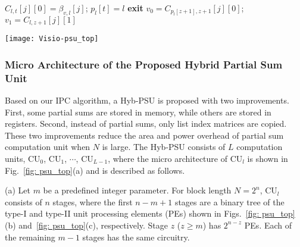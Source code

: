 \documentclass[journal]{IEEEtran}
\begin{document}
\begin{algorithm}
\DontPrintSemicolon
\label{algo: psum_comp}

\BlankLine

 {
 {
 {
$C_{l,t}[j][0] = \beta_{v,l}[j]$; $p_l[t] = l$\;
}
}
}
 {
\textbf{exit}
}
 {
 {
 {
$v_0 = C_{p_l[z+1],z+1}[j][0]$; $v_1= C_{l,z+1}[j][1]$\;
}
}
}
\caption{Index Based Partial Sum Computation (IPC) Algorithm}
\end{algorithm}





\begin{figure*} [hbt]
\centering
\texttt{[image: Visio-psu\_top]}
  \caption{(a) Top architecture of CU$_l$. (b) Type-I PE. (c) Type-II PE. (d) Inputs and outputs of the CN.}\label{fig: psu_top}
\end{figure*}

\subsubsection{Micro Architecture of the Proposed Hybrid Partial Sum Unit}
Based on our IPC algorithm, a Hyb-PSU is proposed with two improvements. First, some partial sums are stored in memory, while others are stored in registers. Second, instead of partial sums, only list index matrices are copied. These two improvements reduce the area and power overhead of partial sum computation unit when $N$ is large. The Hyb-PSU consists of $L$ computation units, CU$_0$, CU$_1$, $\cdots$, CU$_{L-1}$, where the micro architecture of CU$_l$ is shown in Fig.~\ref{fig: psu_top}(a) and is described as follows.

(a) Let $m$ be a predefined integer parameter. For block length $N=2^n$, CU$_l$ consists of $n$ stages, where the first $n-m+1$ stages are a binary tree of the type-I and type-II unit processing elements (PEs) shown in Figs.~\ref{fig: psu_top}(b) and~\ref{fig: psu_top}(c), respectively. Stage $z$ ($z\geqslant m$) has $2^{n-z}$ PEs. Each of the remaining $m-1$ stages has the same circuitry.
\end{document}
